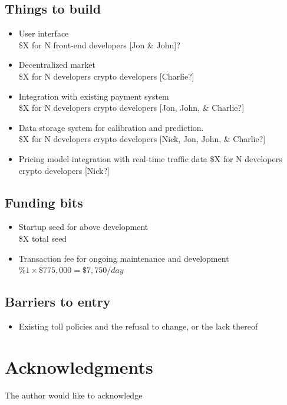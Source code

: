 \documentclass{article}
\begin{document}
\subsection{Things to build}
\begin{itemize}
    \item User interface\\
    \$X for N front-end developers [Jon \& John]?
    
    \item Decentralized market\\
    \$X for N developers crypto developers [Charlie?]
    
    \item Integration with existing payment system\\
    \$X for N developers crypto developers [Jon, John, \& Charlie?]
    
    \item Data storage system for calibration and prediction.\\
    \$X for N developers crypto developers [Nick, Jon, John, \& Charlie?]
    
    \item Pricing model integration with real-time traffic data
    \$X for N developers crypto developers [Nick?]
\end{itemize}

\subsection{Funding bits}
\begin{itemize}
    \item Startup seed for above development\\
    \$X total seed
    \item Transaction fee for ongoing maintenance and development\\
    $\%1 \times \$775,000=\$7,750/day$
\end{itemize}


\subsection{Barriers to entry}
\begin{itemize}
    \item Existing toll policies and the refusal to change, or the lack thereof
\end{itemize}


\section*{Acknowledgments}
The author would like to acknowledge 

\printbibliography
\end{document}
